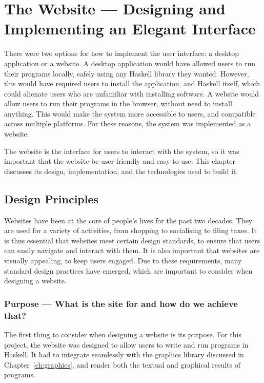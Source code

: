 \documentclass[../main.tex]{subfiles}
\begin{document}
\chapter{The Website — Designing and Implementing an Elegant Interface} \label{ch:website}
    There were two options for how to implement the user interface: a desktop
        application or a website.
    A desktop application would have allowed users to run their programs locally,
        safely using any Haskell library they wanted.
    However, this would have required users to install the application, and Haskell
        itself, which could alienate users who are unfamiliar with installing software.
    A website would allow users to run their programs in the browser, without need
        to install anything.
    This would make the system more accessible to users, and compatible across
        multiple platforms.
    For these reasons, the system was implemented as a website.

    The website is the interface for users to interact with the system, so it was
        important that the website be user-friendly and easy to use.
    This chapter discusses its design, implementation, and the technologies used to
        build it.

    \section{Design Principles}
        Websites have been at the core of people's lives for the past two decades.
        They are used for a variety of activities, from shopping to socialising to
            filing taxes.
        It is thus essential that websites meet certain design standards, to ensure
            that users can easily navigate and interact with them.
        It is also important that websites are visually appealing, to keep users
            engaged.
        Due to these requirements, many standard design practices have emerged, which
            are important to consider when designing a website.

        \subsection{Purpose — What is the site for and how do we achieve that?}
            The first thing to consider when designing a website is its purpose.
            For this project, the website was designed to allow users to write and run
                programs in Haskell.
            It had to integrate seamlessly with the graphics library discussed in
                Chapter~\ref{ch:graphics}, and render both the textual and graphical results of
                programs.
\end{document}
